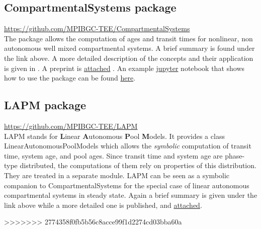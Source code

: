 \documentclass[a4paper]{article}
\begin{document}
\subsection{CompartmentalSystems package}
\url{https://github.com/MPIBGC-TEE/CompartmentalSystems}\\
The package allows the computation of ages and transit times for nonlinear, non autonomous well mixed compartmental systems.
A brief summary is found under the link above. A more detailed description of the concepts and their application is given in \citet[]{MetzlerMuellerSierra2018PNAS}. A preprint is \href{https://github.com/MPIBGC-TEE/bgc-md/blob/master/docs/SiamSoftwareContest/PNAS.pdf}{attached} .
An example \href{jupyter.org}{jupyter} notebook that shows how to use the package can be found 
\href{http://compartmentalsystems.readthedocs.io/en/latest/_downloads/nonl_gcm_3p.html}{here}.

\subsection{LAPM package}
\url{https://github.com/MPIBGC-TEE/LAPM}\\
LAPM stands for {\bf L}inear {\bf A}utonomous {\bf P}ool {\bf M}odels. It provides a class LinearAutonomousPoolModels which allows the \emph{symbolic} computation of transit time, system age, and pool ages.
Since transit time and system age are phase-type distributed, the computations of them rely on properties of this distribution. They are treated in a separate module.
LAPM can be seen as a symbolic companion to CompartmentalSystems for the special case of linear autonomous compartmental systems in steady state.
Again a brief summary is given under the link above while a more detailed one is published, \cite[]{Metzler2017MGS} and \href{https://github.com/MPIBGC-TEE/bgc-md/blob/master/docs/SiamSoftwareContest/markov.pdf}{attached}. 

>>>>>>> 2774358f0fb5b56c8acce99f1d2274cd03bba60a
\end{document}

